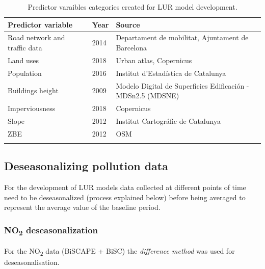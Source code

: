 \documentclass{article}
\begin{document}
\vspace{-2em}

\begin{table}[ht]
\centering
\caption{Predictor varaibles categories created for LUR model development.}
\begin{tabular}{lll}
\toprule
\textbf{Predictor variable} & \textbf{Year} & \textbf{Source} \\
\midrule
Road network and traffic data  & 2014 & Departament de mobilitat, Ajuntament de Barcelona \\
Land uses & 2018 & Urban atlas, Copernicus \\
Population & 2016 & Institut d'Estadística de Catalunya \\
Buildings height & 2009 & Modelo Digital de Superficies Edificación  - MDSn2.5 (MDSNE)\\
Imperviousness & 2018 & Copernicus \\
Slope & 2012 & Institut Cartográfic de Catalunya \\
ZBE & 2012 & OSM\\
\bottomrule
\label{Table S2}
\end{tabular}
\end{table}


\newpage
\subsection{Deseasonalizing pollution data}

For the development of LUR models data collected at different points of time need to be deseasonalized (process explained below) before being averaged to represent the average value of the baseline period. 

\subsubsection{NO\textsubscript{2} deseasonalization}
For the NO\textsubscript{2} data (BiSCAPE + BiSC) the \textit{difference method} was used for deseasonalisation. 
\end{document}
